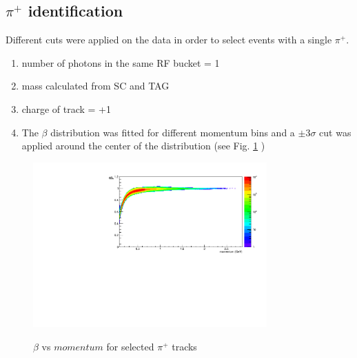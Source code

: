 \subsection{$\pi^+$ identification}
Different cuts were applied on the data in order to select events with a single $\pi^+$.
\begin{enumerate}
  \item number of photons in the same RF bucket = 1
  \item mass calculated from SC and TAG
  \item charge of track = +1
  \item The $\beta$ distribution was fitted for different momentum bins and a $\pm 3 \sigma$ cut was applied around the center of the distribution (see Fig. \ref{fig:beta_mom_pip} )
\end{enumerate}
\begin{figure}[htb]
  \includegraphics[width=0.8\textwidth]{figures/pid_beta_mom_pip.pdf} \\
  \caption{$\beta$ vs $momentum$ for selected $\pi^+$ tracks}
  \label{fig:beta_mom_pip}
\end{figure}

